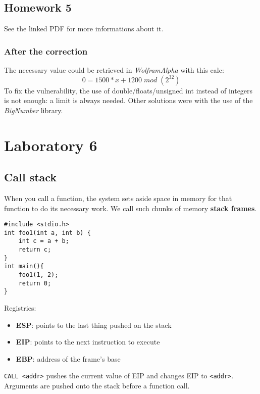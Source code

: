 \documentclass[a4paper, 10pt, titlepage]{article}
\begin{document}
\subsection{Homework 5}
See the linked PDF for more informations about it. 

\subsubsection{After the correction}
The necessary value could be retrieved in \textit{WolframAlpha} with this calc:
	$$0 = 1500*x + 1200 \; mod \; (2^{32})$$
To fix the vulnerability, the use of double/floats/unsigned int instead of integers is not enough: a limit is always needed.
Other solutions were with the use of the \textit{BigNumber} library.

\section{Laboratory 6}
\subsection{Call stack}
When you call a function, the system sets aside space in memory for that function to do its necessary work. We call such chunks of memory \textbf{stack frames}. \medskip\\
\begin{minipage}{0.45\textwidth}
\begin{lstlisting}
#include <stdio.h>
int foo1(int a, int b) {
	int c = a + b;
	return c;
}
int main(){
	foo1(1, 2);
	return 0;
}
\end{lstlisting}
\end{minipage}
\begin{minipage}{0.5\textwidth}
\begin{scriptsize}
Registries:
\begin{itemize}
\item \textbf{ESP}: points to the last thing pushed on the stack
\item \textbf{EIP}: points to the next instruction to execute
\item \textbf{EBP}: address of the frame's base
\end{itemize}
\lstinline|CALL <addr>| pushes the current value of EIP and changes EIP to \lstinline|<addr>|.\medskip \\
Arguments are pushed onto the stack before a function call.
\end{scriptsize}
\end{minipage}
\end{document}
